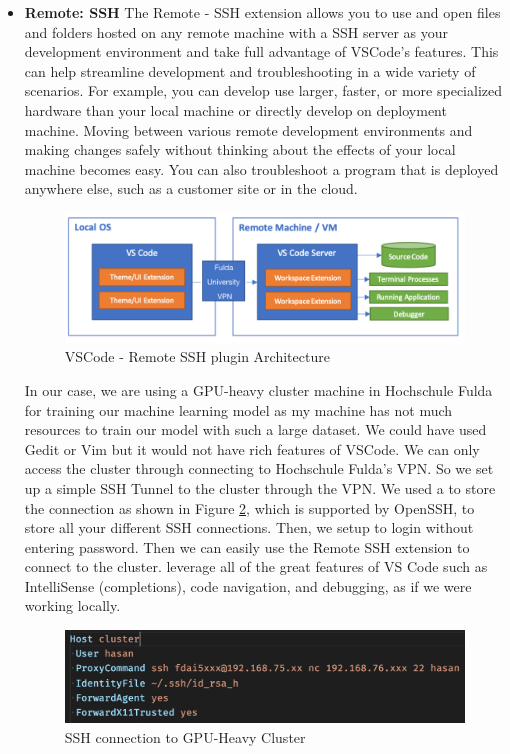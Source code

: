\begin{itemize}
  \item \textbf{Remote: SSH} 
  The Remote - SSH extension\cite{vscode_remote_ssh} allows you to use and open files and folders hosted on any remote machine with a SSH server as your development environment and take full advantage of VSCode's features. This can help streamline development and troubleshooting in a wide variety of scenarios. For example, you can develop use larger, faster, or more specialized hardware than your local machine or directly develop on deployment machine. Moving between various remote development environments and making changes safely without thinking about the effects of your local machine becomes easy. You can also troubleshoot a program that is deployed anywhere else, such as a customer site or in the cloud.
  \par
  \begin{figure}[H]
    \centering
    \includegraphics[scale=0.80]{images/Chapter4/architecture-ssh.png}
    \caption{VSCode - Remote SSH plugin Architecture}
    \label{fig:remote_ssh}
  \end{figure}
  In our case, we are using a GPU-heavy cluster machine in Hochschule Fulda for training our machine learning model as my machine has not much resources to train our model with such a large dataset. We could have used Gedit\cite{gedit} or Vim\cite{vim} but it would not have rich features of VSCode. We can only access the cluster through connecting to Hochschule Fulda's VPN. So we set up a simple SSH Tunnel to the cluster through the VPN. We used a \cite{config_file} to store the connection as shown in Figure \ref{fig:ssh_connection}, which is supported by OpenSSH, to store all your different SSH connections. Then, we setup \cite{key_based_auth} to login without entering password. Then we can easily use the Remote SSH extension to connect to the cluster. leverage all of the great features of VS Code such as IntelliSense (completions), code navigation, and debugging, as if we were working locally.
  \begin{figure}[H]
      \centering
      \includegraphics[scale=0.55]{images/Chapter4/ssh_connection.png}
      \caption{SSH connection to GPU-Heavy Cluster}
      \label{fig:ssh_connection}
    \end{figure}
  \end{itemize}

